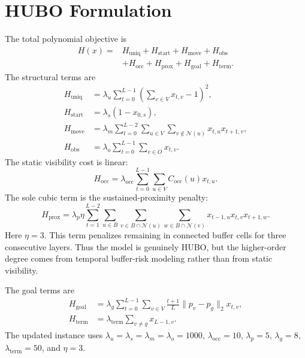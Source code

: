 \documentclass[10pt,conference]{IEEEtran}
\begin{document}
\section{HUBO Formulation}
The total polynomial objective is
\begin{equation}
\begin{split}
H(x) = &H_{\mathrm{uniq}} + H_{\mathrm{start}} + H_{\mathrm{move}} + H_{\mathrm{obs}} \\
&+ H_{\mathrm{occ}} + H_{\mathrm{prox}} + H_{\mathrm{goal}} + H_{\mathrm{term}} .
\end{split}
\end{equation}
The structural terms are
\begin{align}
H_{\mathrm{uniq}} &= \lambda_u \sum_{t=0}^{L-1}\left(\sum_{v\in V} x_{t,v}-1\right)^2,\\
H_{\mathrm{start}} &= \lambda_s(1-x_{0,s}),\\
H_{\mathrm{move}} &= \lambda_m\sum_{t=0}^{L-2}\sum_{u\in V}\sum_{v\notin\mathcal{N}(u)}x_{t,u}x_{t+1,v},\\
H_{\mathrm{obs}} &= \lambda_o\sum_{t=0}^{L-1}\sum_{v\in O}x_{t,v}.
\end{align}
The static visibility cost is linear:
\begin{equation}
H_{\mathrm{occ}}=\lambda_{\mathrm{occ}}\sum_{t=0}^{L-1}\sum_{u\in V}C_{\mathrm{occ}}(u)x_{t,u}.
\end{equation}
The sole cubic term is the sustained-proximity penalty:
\begin{equation}
H_{\mathrm{prox}}=\lambda_p \eta \sum_{t=1}^{L-2}\sum_{u\in B}\sum_{v\in B\cap\mathcal{N}(u)}\sum_{w\in B\cap\mathcal{N}(v)}x_{t-1,u}x_{t,v}x_{t+1,w}.
\end{equation}
Here $\eta=3$. This term penalizes remaining in connected buffer cells for three consecutive layers. Thus the model is genuinely HUBO, but the higher-order degree comes from temporal buffer-risk modeling rather than from static visibility.

The goal terms are
\begin{align}
H_{\mathrm{goal}} &= \lambda_g\sum_{t=0}^{L-1}\sum_{v\in V}\frac{t+1}{L}\|p_v-p_g\|_2x_{t,v},\\
H_{\mathrm{term}} &= \lambda_{\mathrm{term}}\sum_{v\ne g}x_{L-1,v}.
\end{align}
The updated instance uses $\lambda_u=\lambda_s=\lambda_m=\lambda_o=1000$, $\lambda_{\mathrm{occ}}=10$, $\lambda_p=5$, $\lambda_g=8$, $\lambda_{\mathrm{term}}=50$, and $\eta=3$.
\end{document}
